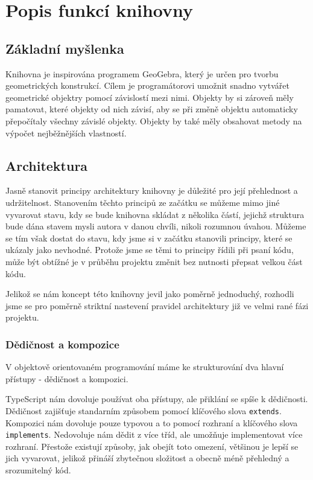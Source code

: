 \chapter{Popis funkcí knihovny}
\label{chap:functionality}

\section{Základní myšlenka}
\label{sec:basic-idea}

Knihovna je inspirována programem GeoGebra, který je určen pro tvorbu geometrických konstrukcí. 
Cílem je programátorovi umožnit snadno vytvářet geometrické objektry pomocí závislostí mezi nimi.
Objekty by si zároveň měly pamatovat, které objekty od nich závisí, aby se při změně objektu automaticky přepočítaly všechny závislé objekty.
Objekty by také měly obsahovat metody na výpočet nejběžnějších vlastností.

\section{Architektura}
\label{sec:architecture}

Jasně stanovit principy architektury knihovny je důležité pro její přehlednost a udržitelnost.
Stanovením těchto principů ze začátku se můžeme mimo jiné vyvarovat stavu, kdy se bude knihovna skládat z několika částí, jejichž struktura bude dána stavem mysli autora v danou chvíli, nikoli rozumnou úvahou.
Můžeme se tím však dostat do stavu, kdy jsme si v začátku stanovili principy, které se ukázaly jako nevhodné. 
Protože jsme se těmi to principy řídili při psaní kódu, může být obtížné je v průběhu projektu změnit bez nutnosti přepsat velkou část kódu.

Jelikož se nám koncept této knihovny jevil jako poměrně jednoduchý, rozhodli jsme se pro poměrně striktní nastevení pravidel architektury již ve velmi rané fázi projektu.

\subsection{Dědičnost a kompozice}
\label{subsec:inheritance-composition}

V objektově orientovaném programování máme ke strukturování dva hlavní přístupy - dědičnost a kompozici.

TypeScript nám dovoluje používat oba přístupy, ale přiklání se spíše k dědičnosti.
Dědičnost zajišťuje standarním způsobem pomocí klíčového slova \texttt{extends}.
Kompozici nám dovoluje pouze typovou a to pomocí rozhraní a klíčového slova \texttt{implements}.
Nedovoluje nám dědit z více tříd, ale umožňuje implementovat více rozhraní.
Přestože existují způsoby, jak obejít toto omezení, většinou je lepší se jich vyvarovat, jelikož přináší zbytečnou složitost a obecně méně přehledný a srozumitelný kód.

